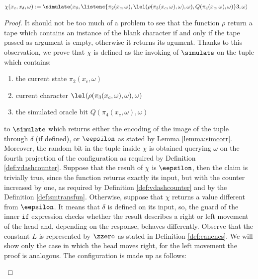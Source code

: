 \begin{conditional}{\notappendix}
\begin{defn}[$\apply$]
\begin{align*}
        \chi(x_c, x_\delta, \omega) &:= \simulate(x_\delta,
                    \listenc{ \pi_2(x_c, \omega),
                              \lel(\rho(\pi_3(x_c, \omega), \omega), \omega),
                              Q(\pi_4(x_c, \omega),\omega)} 3, \omega\rangle
      \end{align*}
    \end{defn}
    \begin{proof}
      It should not be too much of a problem to see
      that the function $\rho$ return a tape which contains an instance of the
      blank character if and only if the tape passed as argument is empty,
      otherwise it returns its agument.
      Thanks to this observation, we prove that $\chi$ is defined as the
      invoking of $\simulate$ on the tuple which contains:
      \begin{enumerate}
        \item the current state $\pi_2(x_c, \omega)$
        \item current character $\lel(\rho(\pi_3(x_c, \omega), \omega), \omega)$
        \item the simulated oracle bit $Q(\pi_4(x_c, \omega),\omega)$
      \end{enumerate} to
      $\simulate$ which returns either the encoding of the image of the tuple
      through $\delta$ (if defined), or $\eepsilon$ as stated by Lemma
      \ref{lemma:simcorr}.
      Moreover, the random bit in the tuple inside $\chi$
      is obtained querying $\omega$ on the fourth projection
      of the configuration as required by Definition \ref{def:vdashcounter}.
      Suppose that the result of $\chi$ is $\eepsilon$, then the claim is
      trivially true, since the function returns exactly its input, but with
      the counter increased by one, as required by Definition
      \ref{def:vdashcounter} and by the Definition \ref{def:smtransfun}.
      Otherwise, suppose that $\chi$ returns a value different from $\eepsilon$.
      It means that $\delta$ is defined on its input, so, the guard of the inner
      $\mathtt{if}$ expression checks whether the result describes a right or
      left movement of the head and, depending on the response, behaves
      differently. Observe that the constant $L$ is represented by $\zzero$
      as stated in Definition \ref{def:canencs}.
       We will show only the case in which the head moves right, for the left
       movement the proof is analogous. The configuration is made up as follows:
       \begin{enumerate}

\end{enumerate}
\end{proof}
\end{conditional}
